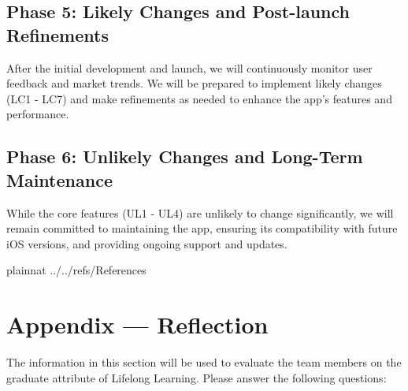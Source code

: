 \documentclass[12pt]{article}
\begin{document}
\subsection{Phase 5: Likely Changes and Post-launch Refinements}

After the initial development and launch, we will continuously monitor user feedback and market trends. We will be prepared to implement likely changes (LC1 - LC7) and make refinements as needed to enhance the app's features and performance.

\subsection{Phase 6: Unlikely Changes and Long-Term Maintenance}

While the core features (UL1 - UL4) are unlikely to change significantly, we will remain committed to maintaining the app, ensuring its compatibility with future iOS versions, and providing ongoing support and updates. 


\newpage

 {plainnat}
 {../../refs/References}



\newpage{}
\section*{Appendix --- Reflection}

The information in this section will be used to evaluate the team members on the
graduate attribute of Lifelong Learning.  Please answer the following questions:
\end{document}
